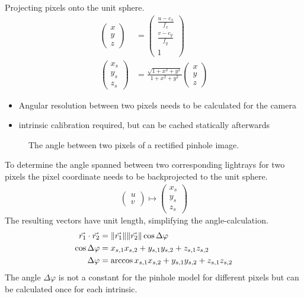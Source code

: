 \documentclass[doktyp=marbeit,fontsize=12pt,sprache=english,draft=true,hausschrift=true,fleqn]{TUBAFarbeiten}
\DeclarePairedDelimiter{\abs}{\lVert}{\rVert} %
\begin{document}
Projecting pixels onto the unit sphere.
\begin{align}
	\begin{pmatrix}x \\ y \\ z \end{pmatrix} &= \begin{pmatrix} \frac{u - c_x}{f_x} \\ \frac{v - c_y}{f_y} \\ 1 \end{pmatrix} \\
	\begin{pmatrix}x_s \\ y_s \\ z_s \end{pmatrix} &= \frac{\sqrt{1 + x^2 + y^2}}{1 + x^2 + y^2} \begin{pmatrix} x \\ y \\ z \end{pmatrix}
\end{align}

\begin{itemize}
    \item Angular resolution between two pixels needs to be calculated for the camera
    \item intrinsic calibration required, but can be cached statically afterwards
\end{itemize}

\begin{figure}[H]
    
	\caption[Angle between two pixels in the pinhole model]{The angle between two pixels of a rectified pinhole image.}
\end{figure}
To determine the angle spanned between two corresponding lightrays for two pixels the pixel coordinate needs to be backprojected to the unit sphere.
\begin{align}
    \begin{pmatrix} u \\ v \end{pmatrix} \mapsto \begin{pmatrix} x_s \\ y_s \\ z_s \end{pmatrix}
\end{align}
The resulting vectors have unit length, simplifying the angle-calculation.
\begin{align}
    \vec{r_1} \cdot \vec{r_2} &= \abs{\vec{r_1}} \abs{\vec{r_2}} \cos \Delta\varphi \\
    \cos \Delta\varphi &= x_{s,1} x_{s,2} + y_{s,1} y_{s,2} + z_{s,1} z_{s,2} \\
    \Delta\varphi &= \arccos{x_{s,1} x_{s,2} + y_{s,1} y_{s,2} + z_{s,1} z_{s,2}}
\end{align}
The angle $\Delta\varphi$ is not a constant for the pinhole model for different pixels but can be calculated once for each intrinsic.
\end{document}
